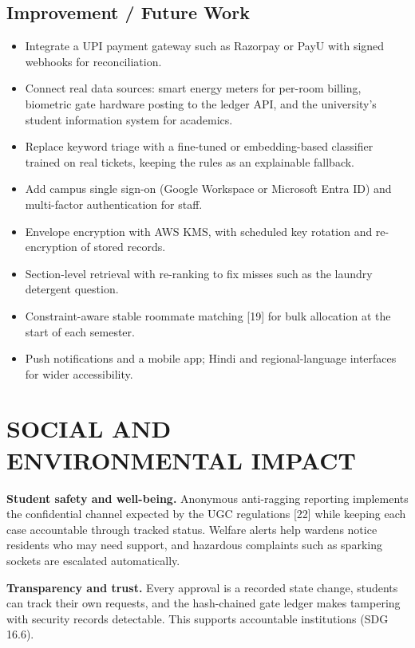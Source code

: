 \documentclass[12pt,a4paper,oneside]{report}
\begin{document}
\section{Improvement / Future Work}
\begin{itemize}
  \item Integrate a UPI payment gateway such as Razorpay or PayU with signed webhooks for reconciliation.
  \item Connect real data sources: smart energy meters for per-room billing, biometric gate hardware posting to the
  ledger API, and the university's student information system for academics.
  \item Replace keyword triage with a fine-tuned or embedding-based classifier trained on real tickets, keeping the
  rules as an explainable fallback.
  \item Add campus single sign-on (Google Workspace or Microsoft Entra ID) and multi-factor authentication for staff.
  \item Envelope encryption with AWS KMS, with scheduled key rotation and re-encryption of stored records.
  \item Section-level retrieval with re-ranking to fix misses such as the laundry detergent question.
  \item Constraint-aware stable roommate matching [19] for bulk allocation at the start of each semester.
  \item Push notifications and a mobile app; Hindi and regional-language interfaces for wider accessibility.
\end{itemize}

\chapter{SOCIAL AND ENVIRONMENTAL IMPACT}
\textbf{Student safety and well-being.} Anonymous anti-ragging reporting implements the confidential channel expected by
the UGC regulations [22] while keeping each case accountable through tracked status. Welfare alerts help wardens notice
residents who may need support, and hazardous complaints such as sparking sockets are escalated automatically.

\textbf{Transparency and trust.} Every approval is a recorded state change, students can track their own requests, and
the hash-chained gate ledger makes tampering with security records detectable. This supports accountable institutions
(SDG 16.6).
\end{document}
